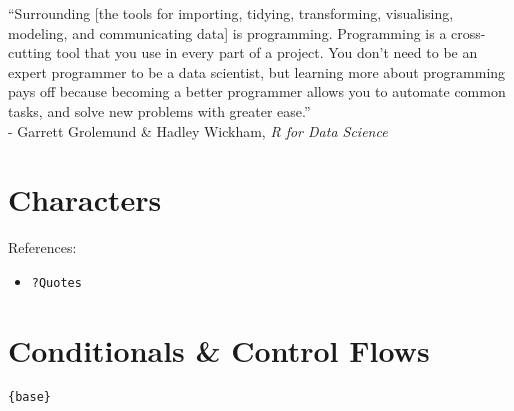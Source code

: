\documentclass[
]{book}
\providecommand{\tightlist}{%
  \setlength{\itemsep}{0pt}\setlength{\parskip}{0pt}}
\begin{document}
``Surrounding {[}the tools for importing, tidying, transforming, visualising, modeling, and communicating data{]} is programming. Programming is a cross-cutting tool that you use in every part of a project. You don't need to be an expert programmer to be a data scientist, but learning more about programming pays off because becoming a better programmer allows you to automate common tasks, and solve new problems with greater ease.''\\
- Garrett Grolemund \& Hadley Wickham, \emph{R for Data Science}

\hypertarget{characters}{%
\section{Characters}\label{characters}}

References:

\begin{itemize}
\tightlist
\item
  \texttt{?Quotes}
\end{itemize}

\hypertarget{conditionals-control-flows}{%
\section{Conditionals \& Control Flows}\label{conditionals-control-flows}}

\texttt{\{base\}}
\end{document}
